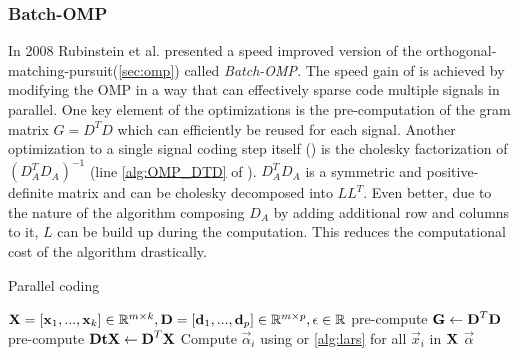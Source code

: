 \subsubsection{Batch-OMP}
In 2008 Rubinstein et al.\cite{Rubinstein2008} presented a speed improved
version of the orthogonal-matching-pursuit(\ref{sec:omp}) called
\emph{Batch-OMP}. The speed gain of  is achieved
by modifying the OMP in a way that can effectively sparse code
multiple signals in parallel. One key element of the optimizations is the
pre-computation of the gram matrix $G=D^TD$ which can efficiently be reused
for each signal. Another optimization to a single signal coding step itself
() is the cholesky factorization of $\left( D_A^T D_A
\right)^{-1}$ (line \ref{alg:OMP_DTD} of ). $D_A^T
D_A$ is a symmetric and positive-definite matrix and can be cholesky decomposed
into $LL^T$. Even better, due to the nature of the algorithm composing $D_A$
by adding additional row and columns to it, $L$ can be build up during the
computation. This reduces the computational cost of the algorithm drastically.

\begin{algorithm}[H]
\caption{Parallel coding}
\label{alg:parallel}
\begin{algorithmic}[1]
\REQUIRE $\boldsymbol{\mathrm{X}} =[\boldsymbol{\mathrm{x}}_1,...,\boldsymbol{\mathrm{x}}_k]  \in \mathbb{R}^{m \times k},
\boldsymbol{\mathrm{D}} =[\boldsymbol{\mathrm{d}}_1,...,\boldsymbol{\mathrm{d}}_p] \in
\mathbb{R}^{m\times p}, \epsilon \in \mathbb{R}$
\STATE pre-compute $\boldsymbol{\mathrm{G}} \gets \boldsymbol{\mathrm{D}}^T\boldsymbol{\mathrm{D}}$
\STATE pre-compute $\boldsymbol{\mathrm{DtX}} \gets \boldsymbol{\mathrm{D}}^T\boldsymbol{\mathrm{X}}$
\STATE Compute $\vec{\alpha}_i$ using  or
\ref{alg:lars} for all $\vec{x}_i$ in $\boldsymbol{\mathrm{X}}$
\ENDFOR
\RETURN $\vec{\alpha}$
\end{algorithmic}
\end{algorithm}

